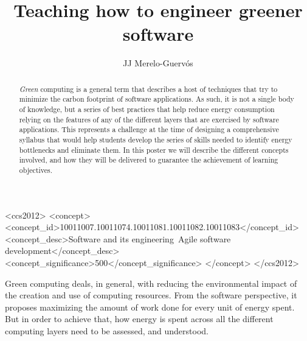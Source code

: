 \documentclass[sigconf]{acmart}
\begin{document}
\title{Teaching how to engineer greener software}

\author{JJ Merelo-Guervós}

\renewcommand{\shortauthors}{J. J. Merelo}

\begin{abstract}
{\em Green} computing is a general term that describes a host of techniques that
try to minimize the carbon footprint of software applications. As such, it is
not a single body of knowledge, but a series of best practices that help reduce
energy consumption relying on the features of any of the different layers that
are exercised by software applications. This represents a challenge at the
time of designing a comprehensive syllabus that would help students develop the
series of skills needed to identify energy bottlenecks and eliminate them. In
this poster we will describe the different concepts involved, and how they will
be delivered to guarantee the achievement of learning objectives.
\end{abstract}

\begin{CCSXML}
<ccs2012>
   <concept>
       <concept_id>10011007.10011074.10011081.10011082.10011083</concept_id>
       <concept_desc>Software and its engineering~Agile software development</concept_desc>
       <concept_significance>500</concept_significance>
       </concept>
 </ccs2012>
\end{CCSXML}





\maketitle

Green computing \cite{kurp2008green} deals, in general, with reducing the
environmental impact of the creation and use of computing resources. From the
software perspective, it proposes maximizing the amount of work done for every
unit of energy spent. But in order to achieve that, how energy is spent across
all the different computing layers need to be assessed, and understood.
\end{document}
